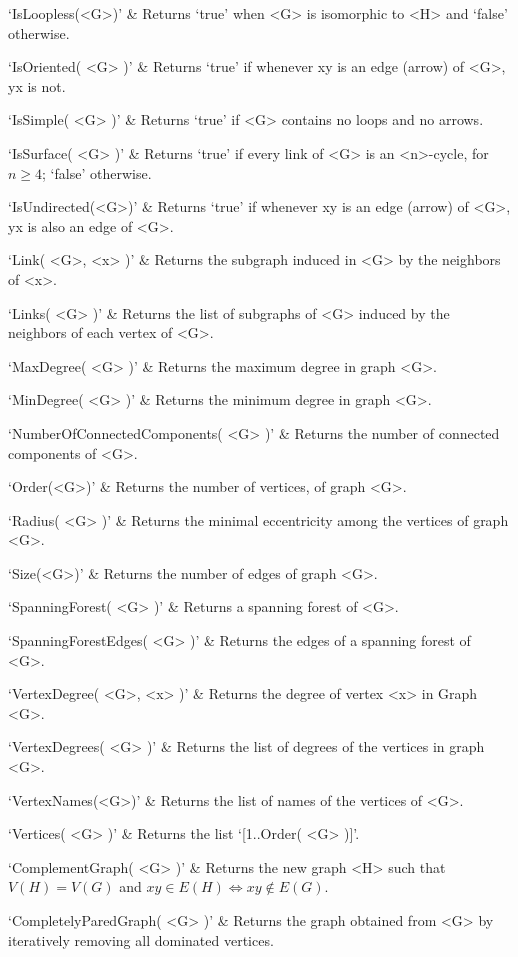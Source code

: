 `IsLoopless(<G>)' & 
Returns `true' when <G> is isomorphic to <H> and `false' otherwise.

`IsOriented( <G> )' & 
Returns `true' if whenever xy is an edge (arrow)  of <G>, yx is not.

`IsSimple( <G> )' & 
Returns `true' if <G> contains no loops and no arrows.

`IsSurface( <G> )' &
Returns `true' if every link of <G> is an <n>-cycle, for $n\geq 4$; `false' otherwise.

`IsUndirected(<G>)' & 
Returns `true' if whenever xy is an edge (arrow) of <G>, yx is also an edge of <G>.

`Link( <G>, <x> )' & 
Returns the subgraph induced in <G> by the neighbors of <x>.

`Links( <G> )' & 
Returns  the  list  of  subgraphs  of <G> induced by the neighbors of each vertex of <G>.

`MaxDegree( <G> )' & 
Returns the maximum degree in graph <G>.

`MinDegree( <G> )' & 
Returns the minimum degree in graph <G>.

`NumberOfConnectedComponents( <G> )' & 
Returns the number of connected components of <G>.

`Order(<G>)' & 
Returns the number of vertices, of graph <G>.

`Radius( <G> )' & 
Returns the minimal eccentricity among the vertices of graph <G>.

`Size(<G>)' & 
Returns the number of edges of graph <G>.

`SpanningForest( <G> )' & 
Returns a spanning forest of <G>.

`SpanningForestEdges( <G> )' & 
Returns the edges of a spanning forest of <G>.

`VertexDegree( <G>, <x> )' & 
Returns the degree of vertex <x> in Graph <G>.

`VertexDegrees( <G> )' & 
Returns the list of degrees of the vertices in graph <G>.

`VertexNames(<G>)' & 
Returns  the  list of names of the vertices of <G>.

`Vertices( <G> )' & 
Returns the list `[1..Order( <G> )]'.
\enditems


\beginitems
`ComplementGraph( <G> )' & 
Returns the new graph <H> such that  $V(H)=V(G)$ and $xy\in E(H) \iff xy \not\in E(G)$.

`CompletelyParedGraph( <G> )' & 
Returns the graph obtained from <G> by iteratively removing all dominated vertices. 

